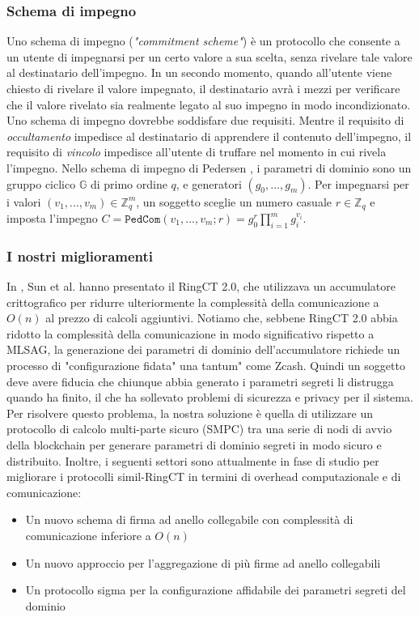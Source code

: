 \subsubsection{Schema di impegno}
Uno schema di impegno (\emph{"commitment scheme"}) è un protocollo che consente a un utente di impegnarsi per un certo valore a sua scelta, senza rivelare tale valore al destinatario dell'impegno. In un secondo momento, quando all'utente viene chiesto di rivelare il valore impegnato, il destinatario avrà i mezzi per verificare che il valore rivelato sia realmente legato al suo impegno in modo incondizionato. Uno schema di impegno dovrebbe soddisfare due requisiti. Mentre il requisito di \emph{occultamento} impedisce al destinatario di apprendere il contenuto dell'impegno,
il requisito di \emph{vincolo} impedisce all'utente di truffare nel momento in cui rivela l'impegno. Nello schema di impegno di Pedersen \cite{c23}, i parametri di dominio sono un gruppo ciclico $\mathds{G}$ di primo ordine $q$, e generatori $(g_0,..., g_m)$. Per impegnarsi per i valori $(v_1,..., v_m) \in \mathds{Z}^m_q$, un soggetto sceglie un numero casuale $r \in \mathds{Z}_q$ e imposta l'impegno
$C = \texttt{PedCom}(v_1,..., v_m; r) = g^r_0\prod^m_{i=1}g^{v_i}_i$.


\subsubsection{I nostri miglioramenti}
In \cite{c31}, Sun et al. hanno presentato il RingCT 2.0, che utilizzava un accumulatore crittografico per ridurre ulteriormente la complessità della comunicazione a $O(n)$ al prezzo di calcoli aggiuntivi. Notiamo che, sebbene RingCT 2.0 abbia ridotto la complessità della comunicazione in modo significativo rispetto a MLSAG, la generazione dei parametri di dominio dell'accumulatore richiede un processo di "configurazione fidata" una tantum" come Zcash. Quindi un soggetto deve avere fiducia che chiunque abbia generato i parametri segreti li distrugga quando ha finito, il che ha sollevato problemi di sicurezza e privacy per il sistema. Per risolvere
questo problema, la nostra soluzione è quella di utilizzare un protocollo di calcolo multi-parte sicuro (SMPC) tra una serie di nodi di avvio della blockchain per generare parametri di dominio segreti in modo sicuro e distribuito. Inoltre, i seguenti settori sono attualmente in fase di studio per migliorare i protocolli simil-RingCT in termini di overhead computazionale e di comunicazione:

\begin{itemize}
	\item Un nuovo schema di firma ad anello collegabile con complessità di comunicazione inferiore a $O(n)$
	\item Un nuovo approccio per l'aggregazione di più firme ad anello collegabili

	\item Un protocollo sigma per la configurazione affidabile dei parametri segreti del dominio
\end{itemize}

